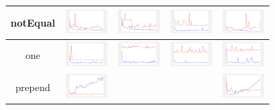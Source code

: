 \begin{longtable}{ c|c c c c}
notEqual
&
\includegraphics[width=1.6cm]{graphs/sequence/small/NEQ}
&
\includegraphics[width=1.6cm]{graphs/set/small/NEQ}
&
\includegraphics[width=1.6cm]{graphs/bag/small/NEQ}
&
\includegraphics[width=1.6cm]{graphs/orderedset/small/NEQ}
\\\hline

one
&
\includegraphics[width=1.6cm]{graphs/sequence/small/One}
&
\includegraphics[width=1.6cm]{graphs/set/small/One}
&
\includegraphics[width=1.6cm]{graphs/bag/small/One}
&
\includegraphics[width=1.6cm]{graphs/orderedset/small/One}
\\\hline

prepend
&
\includegraphics[width=1.6cm]{graphs/sequence/small/Prepend}
&
&
&
\includegraphics[width=1.6cm]{graphs/orderedset/small/Prepend}
\\\hline


\end{longtable}
